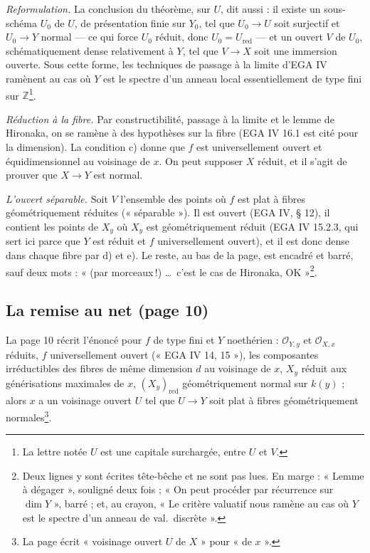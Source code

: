 \documentclass[11pt,a4paper]{article}
\begin{document}
\emph{Reformulation.} La conclusion du théorème, sur $U$, dit aussi : il existe un
sous-schéma $U_0$ de $U$, de présentation finie sur $Y_0$, tel que $U_0 \to U$
soit surjectif et $U_0 \to Y$ normal --- ce qui force $U_0$ réduit, donc
$U_0 = U_{\mathrm{red}}$ --- et un ouvert $V$ de $U_0$, schématiquement dense
relativement à $Y$, tel que $V \to X$ soit une immersion ouverte. Sous cette
forme, les techniques de passage à la limite d'EGA IV ramènent au cas où $Y$
est le spectre d'un anneau local essentiellement de type fini sur
$\mathbb{Z}$\footnote{La lettre notée $U$ est une capitale surchargée, entre
$U$ et $V$.}.

\emph{Réduction à la fibre.} Par constructibilité, passage à la limite et le
lemme de Hironaka, on se ramène à des hypothèses sur la fibre (EGA IV 16.1
est cité pour la dimension). La condition c) donne que $f$ est universellement
ouvert et équidimensionnel au voisinage de $x$. On peut supposer $X$ réduit,
et il s'agit de prouver que $X \to Y$ est normal.

\emph{L'ouvert séparable.} Soit $V$ l'ensemble des points où $f$ est plat à
fibres géométriquement réduites (« séparable »). Il est ouvert (EGA IV, § 12),
il contient les points de $X_y$ où $X_y$ est géométriquement réduit (EGA IV
15.2.3, qui sert ici parce que $Y$ est réduit et $f$ universellement ouvert),
et il est donc dense dans chaque fibre par d) et e). Le reste, au bas de la
page, est encadré et barré, sauf deux mots : « (par morceaux\,!) \ldots\ c'est
le cas de Hironaka, OK »\footnote{Deux lignes y sont écrites tête-bêche et ne
sont pas lues. En marge : « Lemme à dégager », souligné deux fois ; « On peut
procéder par récurrence sur $\dim Y$ », barré ; et, au crayon, « Le critère
valuatif nous ramène au cas où $Y$ est le spectre d'un anneau de val.\
discrète ».}.

\subsection*{La remise au net (page 10)}

La page 10 récrit l'énoncé pour $f$ de type fini et $Y$ noethérien :
$\mathcal{O}_{Y,y}$ et $\mathcal{O}_{X,x}$ réduits, $f$ universellement ouvert
(« EGA IV 14, 15 »), les composantes irréductibles des fibres de même
dimension $d$ au voisinage de $x$, $X_y$ réduit aux générisations maximales de
$x$, $(X_y)_{\mathrm{red}}$ géométriquement normal sur $k(y)$ ; alors $x$ a un
voisinage ouvert $U$ tel que $U \to Y$ soit plat à fibres géométriquement
normales\footnote{La page écrit « voisinage ouvert $U$ de $X$ » pour « de
$x$ ».}.
\end{document}
